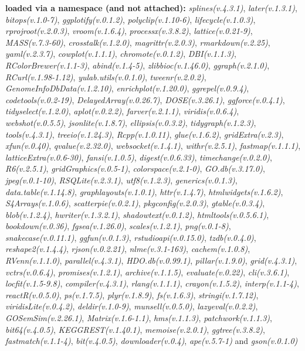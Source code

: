 \documentclass[
]{book}
\begin{document}
\textbf{loaded via a namespace (and not attached):}
\emph{splines(v.4.3.1)}, \emph{later(v.1.3.1)}, \emph{bitops(v.1.0-7)}, \emph{ggplotify(v.0.1.2)}, \emph{polyclip(v.1.10-6)}, \emph{lifecycle(v.1.0.3)}, \emph{rprojroot(v.2.0.3)}, \emph{vroom(v.1.6.4)}, \emph{processx(v.3.8.2)}, \emph{lattice(v.0.21-9)}, \emph{MASS(v.7.3-60)}, \emph{crosstalk(v.1.2.0)}, \emph{magrittr(v.2.0.3)}, \emph{rmarkdown(v.2.25)}, \emph{yaml(v.2.3.7)}, \emph{cowplot(v.1.1.1)}, \emph{chromote(v.0.1.2)}, \emph{DBI(v.1.1.3)}, \emph{RColorBrewer(v.1.1-3)}, \emph{abind(v.1.4-5)}, \emph{zlibbioc(v.1.46.0)}, \emph{ggraph(v.2.1.0)}, \emph{RCurl(v.1.98-1.12)}, \emph{yulab.utils(v.0.1.0)}, \emph{tweenr(v.2.0.2)}, \emph{GenomeInfoDbData(v.1.2.10)}, \emph{enrichplot(v.1.20.0)}, \emph{ggrepel(v.0.9.4)}, \emph{codetools(v.0.2-19)}, \emph{DelayedArray(v.0.26.7)}, \emph{DOSE(v.3.26.1)}, \emph{ggforce(v.0.4.1)}, \emph{tidyselect(v.1.2.0)}, \emph{aplot(v.0.2.2)}, \emph{farver(v.2.1.1)}, \emph{viridis(v.0.6.4)}, \emph{webshot(v.0.5.5)}, \emph{jsonlite(v.1.8.7)}, \emph{ellipsis(v.0.3.2)}, \emph{tidygraph(v.1.2.3)}, \emph{tools(v.4.3.1)}, \emph{treeio(v.1.24.3)}, \emph{Rcpp(v.1.0.11)}, \emph{glue(v.1.6.2)}, \emph{gridExtra(v.2.3)}, \emph{xfun(v.0.40)}, \emph{qvalue(v.2.32.0)}, \emph{websocket(v.1.4.1)}, \emph{withr(v.2.5.1)}, \emph{fastmap(v.1.1.1)}, \emph{latticeExtra(v.0.6-30)}, \emph{fansi(v.1.0.5)}, \emph{digest(v.0.6.33)}, \emph{timechange(v.0.2.0)}, \emph{R6(v.2.5.1)}, \emph{gridGraphics(v.0.5-1)}, \emph{colorspace(v.2.1-0)}, \emph{GO.db(v.3.17.0)}, \emph{jpeg(v.0.1-10)}, \emph{RSQLite(v.2.3.1)}, \emph{utf8(v.1.2.3)}, \emph{generics(v.0.1.3)}, \emph{data.table(v.1.14.8)}, \emph{graphlayouts(v.1.0.1)}, \emph{httr(v.1.4.7)}, \emph{htmlwidgets(v.1.6.2)}, \emph{S4Arrays(v.1.0.6)}, \emph{scatterpie(v.0.2.1)}, \emph{pkgconfig(v.2.0.3)}, \emph{gtable(v.0.3.4)}, \emph{blob(v.1.2.4)}, \emph{hwriter(v.1.3.2.1)}, \emph{shadowtext(v.0.1.2)}, \emph{htmltools(v.0.5.6.1)}, \emph{bookdown(v.0.36)}, \emph{fgsea(v.1.26.0)}, \emph{scales(v.1.2.1)}, \emph{png(v.0.1-8)}, \emph{snakecase(v.0.11.1)}, \emph{ggfun(v.0.1.3)}, \emph{rstudioapi(v.0.15.0)}, \emph{tzdb(v.0.4.0)}, \emph{reshape2(v.1.4.4)}, \emph{rjson(v.0.2.21)}, \emph{nlme(v.3.1-163)}, \emph{cachem(v.1.0.8)}, \emph{RVenn(v.1.1.0)}, \emph{parallel(v.4.3.1)}, \emph{HDO.db(v.0.99.1)}, \emph{pillar(v.1.9.0)}, \emph{grid(v.4.3.1)}, \emph{vctrs(v.0.6.4)}, \emph{promises(v.1.2.1)}, \emph{archive(v.1.1.5)}, \emph{evaluate(v.0.22)}, \emph{cli(v.3.6.1)}, \emph{locfit(v.1.5-9.8)}, \emph{compiler(v.4.3.1)}, \emph{rlang(v.1.1.1)}, \emph{crayon(v.1.5.2)}, \emph{interp(v.1.1-4)}, \emph{reactR(v.0.5.0)}, \emph{ps(v.1.7.5)}, \emph{plyr(v.1.8.9)}, \emph{fs(v.1.6.3)}, \emph{stringi(v.1.7.12)}, \emph{viridisLite(v.0.4.2)}, \emph{deldir(v.1.0-9)}, \emph{munsell(v.0.5.0)}, \emph{lazyeval(v.0.2.2)}, \emph{GOSemSim(v.2.26.1)}, \emph{Matrix(v.1.6-1.1)}, \emph{hms(v.1.1.3)}, \emph{patchwork(v.1.1.3)}, \emph{bit64(v.4.0.5)}, \emph{KEGGREST(v.1.40.1)}, \emph{memoise(v.2.0.1)}, \emph{ggtree(v.3.8.2)}, \emph{fastmatch(v.1.1-4)}, \emph{bit(v.4.0.5)}, \emph{downloader(v.0.4)}, \emph{ape(v.5.7-1)} and \emph{gson(v.0.1.0)}
\end{document}
